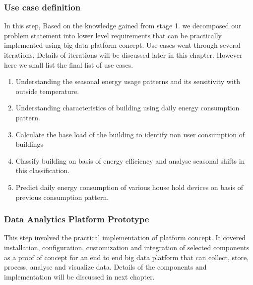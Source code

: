\subsubsection{Use case definition} \label{usecases}
In this step, Based on the knowledge gained from stage 1. we decomposed our problem statement into lower level requirements that can be practically implemented using big data platform concept. Use cases went through several iterations. Details of iterations will be discussed later in this chapter. However here we shall list the final list of use cases.
\begin{enumerate}
\item Understanding the seasonal energy usage patterns and its sensitivity with outside temperature.
\item Understanding characteristics of building using daily energy consumption pattern.
\item Calculate the base load of the building to identify non user consumption of buildings
\item Classify building on basis of energy efficiency and analyse seasonal shifts in this classification.
\item Predict daily energy consumption of various house hold devices on basis of previous consumption pattern.
\end{enumerate}
\subsubsection{Data Analytics Platform Prototype}
This step involved the practical implementation of platform concept. It covered installation, configuration, customization and integration of selected components as a proof of concept for an end to end big data platform that can collect, store, process, analyse and visualize data. Details of the components and implementation will be discussed in next chapter.
